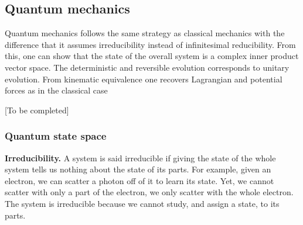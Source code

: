 \documentclass[twocolumn]{article}
\newif\ifextended
\newcommand\fact[2]{\ifextended \emph{#1}. #2 \fi}
\begin{document}
\subsection{Quantum mechanics}

Quantum mechanics follows the same strategy as classical mechanics with the difference that it assumes irreducibility instead of infinitesimal reducibility. From this, one can show that the state of the overall system is a complex inner product vector space. The deterministic and reversible evolution corresponds to unitary evolution. From kinematic equivalence one recovers Lagrangian and potential forces as in the classical case

[To be completed]

\subsubsection{Quantum state space}

\textbf{Irreducibility.} A system is said irreducible if giving the state of the whole system tells us nothing about the state of its parts. For example, given an electron, we can scatter a photon off of it to learn its state. Yet, we cannot scatter with only a part of the electron, we only scatter with the whole electron. The system is irreducible because we cannot study, and assign a state, to its parts.

\fact{Divisibility vs reducibility vs decomposability} {There are three concepts that are often confused to one another. Divisibility is the possibility to divide a system into two independent ones. That is, we have a time evolution such that we start from a state of a system and we end up with two states of independent systems. Reducibility is the ability to describe a system as the composition of more systems. That is, giving the state of the system at one time is the same as giving the state of the parts at the same time. These are independent properties.\footnote{For example, the Planarian worm is divisible into two worms but is not reducible to two worms. A muon is divisible (i.e. it decays) into an electron and two neutrinos but is not reducible to them. A magnetic is reducible to a north and a south pole but is not divisible into them. A proton is reducible to quarks and gluons but is not divisible into them.} Decomposability is the ability to treat one object as the composition of others. We take two objects or descriptions and combine them formally to give a new one. This is again independent from the rest and often is just mathematical convenience.\footnote{For example, velocity in any direction can be decomposed into the components along the axis, but is not divisible or reducible to those components. A pure state is decomposable into a linear combination of a basis but is not reducible or divisible into the basis.}}
\end{document}
